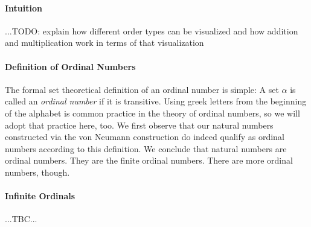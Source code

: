 \paragraph{Intuition} ...TODO: explain how different order types can be visualized and how addition and multiplication work in terms of that visualization

\paragraph{Definition of Ordinal Numbers}
The formal set theoretical definition of an ordinal number is simple: A set $\alpha$ is called an \emph{ordinal number} if it is transitive. Using greek letters from the beginning of the alphabet is common practice in the theory of ordinal numbers, so we will adopt that practice here, too. We first observe that our natural numbers constructed via the von Neumann construction do indeed qualify as ordinal numbers according to this definition. We conclude that natural numbers are ordinal numbers. They are the finite ordinal numbers. There are more ordinal numbers, though. 

\paragraph{Infinite Ordinals}
...TBC...









